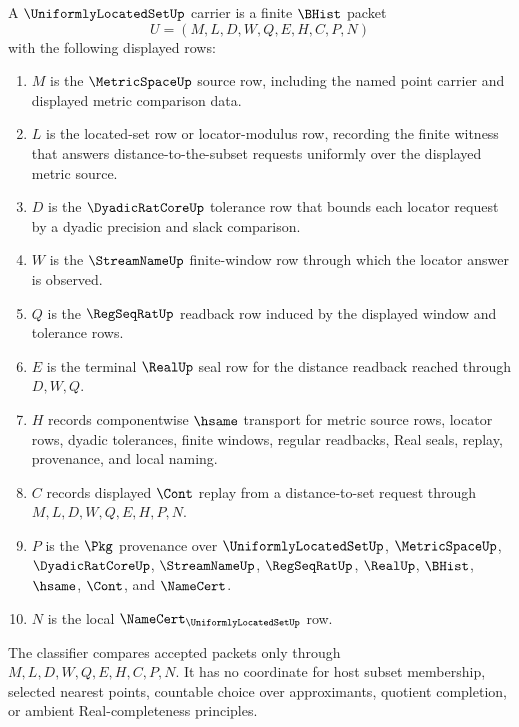 \begin{definition}
\label{def:uniformly-located-set-carrier}
A $\UniformlyLocatedSetUp$ carrier is a finite $\BHist$ packet
$$
U=(M,L,D,W,Q,E,H,C,P,N)
$$
with the following displayed rows:
\begin{enumerate}
\item $M$ is the $\MetricSpaceUp$ source row, including the named point carrier and displayed metric comparison data.
\item $L$ is the located-set row or locator-modulus row, recording the finite witness that answers distance-to-the-subset requests uniformly over the displayed metric source.
\item $D$ is the $\DyadicRatCoreUp$ tolerance row that bounds each locator request by a dyadic precision and slack comparison.
\item $W$ is the $\StreamNameUp$ finite-window row through which the locator answer is observed.
\item $Q$ is the $\RegSeqRatUp$ readback row induced by the displayed window and tolerance rows.
\item $E$ is the terminal $\RealUp$ seal row for the distance readback reached through $D,W,Q$.
\item $H$ records componentwise $\hsame$ transport for metric source rows, locator rows, dyadic tolerances, finite windows, regular readbacks, Real seals, replay, provenance, and local naming.
\item $C$ records displayed $\Cont$ replay from a distance-to-set request through $M,L,D,W,Q,E,H,P,N$.
\item $P$ is the $\Pkg$ provenance over $\UniformlyLocatedSetUp$, $\MetricSpaceUp$, $\DyadicRatCoreUp$, $\StreamNameUp$, $\RegSeqRatUp$, $\RealUp$, $\BHist$, $\hsame$, $\Cont$, and $\NameCert$.
\item $N$ is the local $\NameCert_{\UniformlyLocatedSetUp}$ row.
\end{enumerate}
The classifier compares accepted packets only through $M,L,D,W,Q,E,H,C,P,N$. It has no coordinate for host subset membership, selected nearest points, countable choice over approximants, quotient completion, or ambient Real-completeness principles.
\end{definition}

